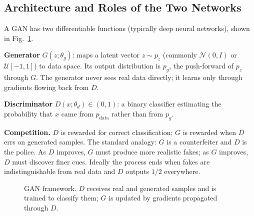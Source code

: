 \documentclass[conference]{IEEEtran}
\newcommand{\pdata}{p_{\mathrm{data}}}
\newcommand{\pg}{p_{g}}
\newcommand{\pz}{p_{z}}
\newcommand{\thg}{\theta_g}
\newcommand{\thd}{\theta_d}
\theoremstyle{plain}
\theoremstyle{definition}
\begin{document}
\subsection{Architecture and Roles of the Two Networks}
A GAN has two differentiable functions (typically deep neural networks), shown in Fig.~\ref{fig:gan}.

\textbf{Generator} $G(z;\thg)$: maps a latent vector $z\sim\pz$ (commonly $\mathcal{N}(0,I)$ or $\mathcal{U}[-1,1]$) to data space. Its output distribution is $\pg$, the push-forward of $\pz$ through $G$. The generator never sees real data directly; it learns only through gradients flowing back from $D$.

\textbf{Discriminator} $D(x;\thd)\in(0,1)$: a binary classifier estimating the probability that $x$ came from $\pdata$ rather than from $\pg$.

\textbf{Competition.} $D$ is rewarded for correct classification; $G$ is rewarded when $D$ errs on generated samples. The standard analogy: $G$ is a counterfeiter and $D$ is the police. As $D$ improves, $G$ must produce more realistic fakes; as $G$ improves, $D$ must discover finer cues. Ideally the process ends when fakes are indistinguishable from real data and $D$ outputs $1/2$ everywhere.

\begin{figure}[t]
\centering
{}
\caption{GAN framework. $D$ receives real and generated samples and is trained to classify them; $G$ is updated by gradients propagated through $D$.}
\label{fig:gan}
\end{figure}
\end{document}
